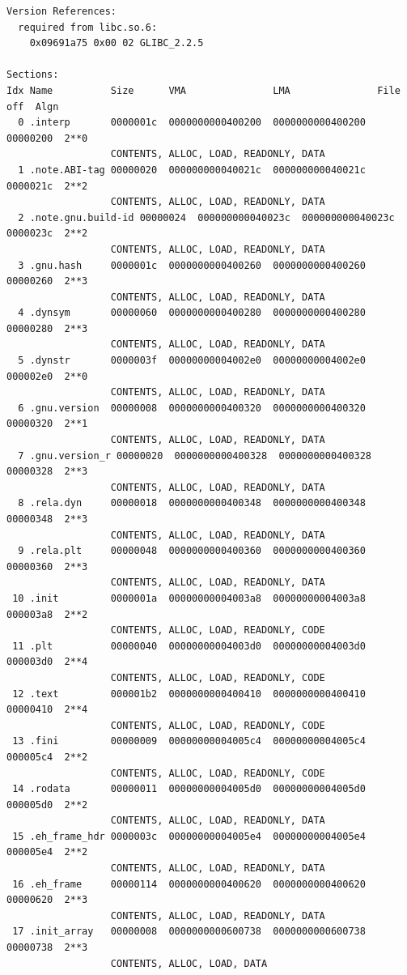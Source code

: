 \begin{verbatim}
Version References:
  required from libc.so.6:
    0x09691a75 0x00 02 GLIBC_2.2.5

Sections:
Idx Name          Size      VMA               LMA               File off  Algn
  0 .interp       0000001c  0000000000400200  0000000000400200  00000200  2**0
                  CONTENTS, ALLOC, LOAD, READONLY, DATA
  1 .note.ABI-tag 00000020  000000000040021c  000000000040021c  0000021c  2**2
                  CONTENTS, ALLOC, LOAD, READONLY, DATA
  2 .note.gnu.build-id 00000024  000000000040023c  000000000040023c  0000023c  2**2
                  CONTENTS, ALLOC, LOAD, READONLY, DATA
  3 .gnu.hash     0000001c  0000000000400260  0000000000400260  00000260  2**3
                  CONTENTS, ALLOC, LOAD, READONLY, DATA
  4 .dynsym       00000060  0000000000400280  0000000000400280  00000280  2**3
                  CONTENTS, ALLOC, LOAD, READONLY, DATA
  5 .dynstr       0000003f  00000000004002e0  00000000004002e0  000002e0  2**0
                  CONTENTS, ALLOC, LOAD, READONLY, DATA
  6 .gnu.version  00000008  0000000000400320  0000000000400320  00000320  2**1
                  CONTENTS, ALLOC, LOAD, READONLY, DATA
  7 .gnu.version_r 00000020  0000000000400328  0000000000400328  00000328  2**3
                  CONTENTS, ALLOC, LOAD, READONLY, DATA
  8 .rela.dyn     00000018  0000000000400348  0000000000400348  00000348  2**3
                  CONTENTS, ALLOC, LOAD, READONLY, DATA
  9 .rela.plt     00000048  0000000000400360  0000000000400360  00000360  2**3
                  CONTENTS, ALLOC, LOAD, READONLY, DATA
 10 .init         0000001a  00000000004003a8  00000000004003a8  000003a8  2**2
                  CONTENTS, ALLOC, LOAD, READONLY, CODE
 11 .plt          00000040  00000000004003d0  00000000004003d0  000003d0  2**4
                  CONTENTS, ALLOC, LOAD, READONLY, CODE
 12 .text         000001b2  0000000000400410  0000000000400410  00000410  2**4
                  CONTENTS, ALLOC, LOAD, READONLY, CODE
 13 .fini         00000009  00000000004005c4  00000000004005c4  000005c4  2**2
                  CONTENTS, ALLOC, LOAD, READONLY, CODE
 14 .rodata       00000011  00000000004005d0  00000000004005d0  000005d0  2**2
                  CONTENTS, ALLOC, LOAD, READONLY, DATA
 15 .eh_frame_hdr 0000003c  00000000004005e4  00000000004005e4  000005e4  2**2
                  CONTENTS, ALLOC, LOAD, READONLY, DATA
 16 .eh_frame     00000114  0000000000400620  0000000000400620  00000620  2**3
                  CONTENTS, ALLOC, LOAD, READONLY, DATA
 17 .init_array   00000008  0000000000600738  0000000000600738  00000738  2**3
                  CONTENTS, ALLOC, LOAD, DATA

\end{verbatim}
